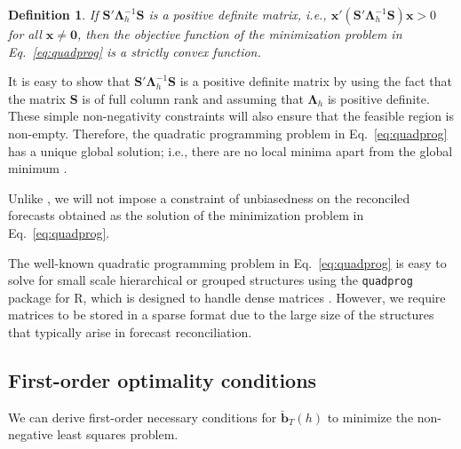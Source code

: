 \documentclass[11pt]{article}
\newcommand{\0}{\phantom{0}}
\newtheorem{definition}{Definition}[section]
\begin{document}
\begin{definition}
	If $\bm{S}'\bm{\Lambda}_{h}^{-1}\bm{S}$ is a positive definite matrix, i.e., $\bm{x}'(\bm{S}'\bm{\Lambda}_{h}^{-1}\bm{S})\bm{x} > 0$ for all $\bm{x} \neq \bm{0}$, then the objective function of the minimization problem in Eq.~\eqref{eq:quadprog} is a strictly convex function.
\end{definition}

It is easy to show that $\bm{S}'\bm{\Lambda}_{h}^{-1}\bm{S}$ is a positive definite matrix by using the fact that the matrix $\bm{S}$ is of full column rank and assuming that $\bm{\Lambda}_{h}$ is positive definite. These simple non-negativity constraints will also ensure that the feasible region is non-empty. Therefore, the quadratic programming problem in Eq.~\eqref{eq:quadprog} has a unique global solution; i.e., there are no local minima apart from the global minimum \citep{Turl2015}.

Unlike \citet{Wick2018}, we will not impose a constraint of unbiasedness on the reconciled forecasts obtained as the solution of the minimization problem in Eq.~\eqref{eq:quadprog}.

The well-known quadratic programming problem in Eq.~\eqref{eq:quadprog} is easy to solve for small scale hierarchical or grouped structures using the \texttt{quadprog} package for R, which is designed to handle dense matrices \citep{quadprog2013}. However, we require matrices to be stored in a sparse format due to the large size of the structures that typically arise in forecast reconciliation.

\subsection{First-order optimality conditions}

We can derive first-order necessary conditions for $\breve{\bm{b}}_{T}(h)$ to minimize the non-negative least squares problem.
\end{document}
